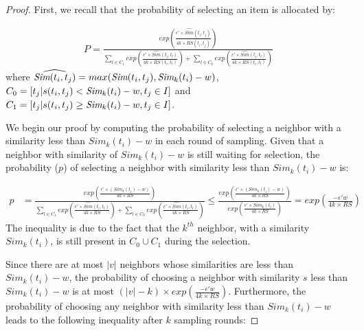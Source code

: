 \documentclass[11pt]{article}
\theoremstyle{plain}
\theoremstyle{definition}
\begin{document}
\begin{proof}
First, we recall that the probability of selecting an item is allocated by:

\begin{align*}
P =
\frac
{
	exp(\frac{\epsilon' \times \widehat{Sim}(t_i, t_j)}{4k \times RS(t_i, t_j)})
}
{
	\sum \limits_{l \in C_1} exp(\frac{\epsilon' \times \widehat{Sim}(t_i, t_l)}{4k \times RS(t_i, t_l)}) +
	\sum \limits_{l \in C_0} exp(\frac{\epsilon' \times \widehat{Sim}(t_i, t_l)}{4k \times RS(t_i, t_l)})
}
\end{align*}
where $\widehat{\emph{Sim}(t_i, t_j)} = max(\emph{Sim}(t_i, t_j), \emph{Sim}_k(t_i) - w)$, $C_0 = \lbrack t_j | s(t_i, t_j) < \emph{Sim}_k(t_i)-w, t_j \in I\rbrack$ and $C_1 = \lbrack t_j | s(t_i, t_j) \geq \emph{Sim}_k(t_i)-w, t_j \in I\rbrack$.


We begin our proof by computing the probability of selecting a neighbor with a similarity less than $Sim_k(t_i) - w$ in each round of sampling. Given that a neighbor with similarity of $Sim_k(t_i) -w$ is still waiting for selection, the probability ($p$) of selecting a neighbor with similarity less than $Sim_k(t_i) - w$ is:

\begin{align*}
p &=
\frac
{
	exp(\frac{\epsilon' \times (Sim_k(t_i) - w)}{4k \times RS})
}
{
	\sum \limits_{l \in C_1} exp(\frac{\epsilon' \times \widehat{Sim}(t_i, t_l)}{4k \times RS}) +
	\sum \limits_{l \in C_0} exp(\frac{\epsilon' \times \widehat{Sim}(t_i, t_l)}{4k \times RS})
}
\leq
\frac
{
	exp(\frac{\epsilon' \times (Sim_k(t_i) - w)}{4k \times RS})
}
{
	exp(\frac{\epsilon' \times Sim_k(t_i)}{4k \times RS})
}
=
exp(\frac{-\epsilon' w}{4k \times RS})
\end{align*}
The inequality is due to the fact that the $k^{th}$ neighbor, with a similarity $Sim_k(t_i)$, is still present in $C_0 \cup C_1$ during the selection.

Since there are at most $\lvert v \rvert$ neighbors whose similarities are less than $Sim_k(t_i) - w$, the probability of choosing a neighbor with similarity $s$ less than $Sim_k(t_i) - w$ is at most $(\lvert v \rvert - k) \times exp(\frac{-\epsilon'w}{4k \times RS})$. Furthermore, the probability of choosing any neighbor with similarity less than $Sim_k(t_i) - w$ leads to the following inequality after $k$ sampling rounds:


\end{proof}
\end{document}
